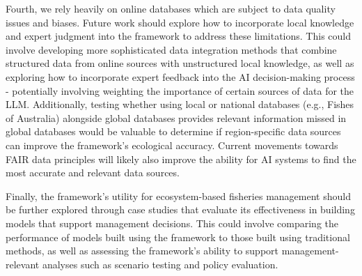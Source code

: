 Fourth, we rely heavily on online databases which are subject to data quality issues and biases. Future work should explore how to incorporate local knowledge and expert judgment into the framework to address these limitations. This could involve developing more sophisticated data integration methods that combine structured data from online sources with unstructured local knowledge, as well as exploring how to incorporate expert feedback into the AI decision-making process - potentially involving weighting the importance of certain sources of data for the LLM. Additionally, testing whether using local or national databases (e.g., Fishes of Australia) alongside global databases provides relevant information missed in global databases would be valuable to determine if region-specific data sources can improve the framework's ecological accuracy. Current movements towards FAIR data principles \citep{tanhua2019ocean} will likely also improve the ability for AI systems to find the most accurate and relevant data sources.

Finally, the framework's utility for ecosystem-based fisheries management should be further explored through case studies that evaluate its effectiveness in building models that support management decisions. This could involve comparing the performance of models built using the framework to those built using traditional methods, as well as assessing the framework's ability to support management-relevant analyses such as scenario testing and policy evaluation.



